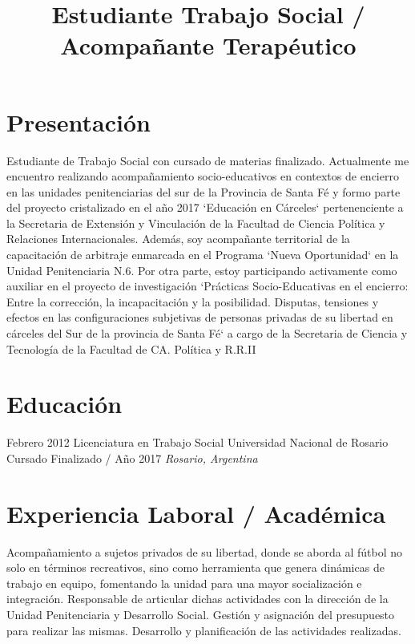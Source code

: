 \documentclass[11pt,a4paper,sans]{moderncv}        %
\title{Estudiante Trabajo Social / Acompañante Terap\'eutico}                               %
\begin{document}
\makecvtitle

\section{Presentación}
Estudiante de Trabajo Social con cursado de materias finalizado. Actualmente me encuentro realizando acompañamiento socio-educativos en contextos de encierro en las unidades penitenciarias del sur de la Provincia de Santa F\'e y formo parte del proyecto cristalizado en el año 2017 `Educación en Cárceles` pertenenciente a la Secretaria de Extensi\'on y Vinculación de la Facultad de Ciencia Pol\'itica y Relaciones Internacionales. Además, soy acompañante territorial de la capacitación de arbitraje enmarcada en el Programa `Nueva Oportunidad` en la Unidad Penitenciaria N.6. Por otra parte, estoy participando activamente como auxiliar en el proyecto de investigaci\'on `Pr\'acticas Socio-Educativas en el encierro: Entre la correcci\'on, la incapacitación y la posibilidad. Disputas, tensiones y efectos en las configuraciones subjetivas de personas privadas de su libertad en cárceles del Sur de la provincia de Santa F\'e` a cargo de la Secretaria de Ciencia y Tecnología de la Facultad de CA. Política y R.R.II
\vspace{2mm}

\section{Educación}
\cventry
{Febrero 2012}
{Licenciatura en Trabajo Social}
{Universidad Nacional de Rosario}
{Cursado Finalizado / Año 2017}
{}
{\textit{Rosario, Argentina}}
{}
\vspace{2mm}


\section{Experiencia Laboral / Acad\'emica}
  {
    Acompañamiento a sujetos privados de su libertad, donde se aborda al fútbol no solo en términos recreativos, sino como herramienta que genera dinámicas de trabajo en equipo, fomentando la unidad para una mayor socialización e integración.
    Responsable de articular dichas actividades con la dirección de la Unidad Penitenciaria y Desarrollo Social. Gestión y asignación del presupuesto para realizar las mismas. Desarrollo y planificación de las actividades realizadas.
  }
\vspace{3mm}
\end{document}
